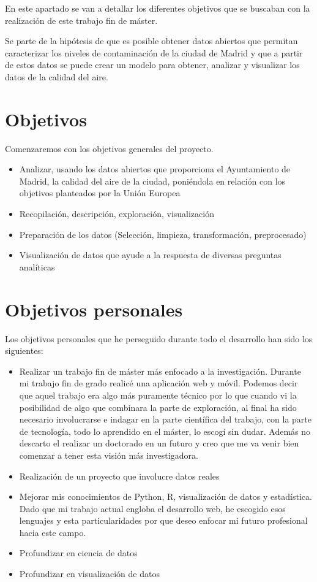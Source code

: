 
En este apartado se van a detallar los diferentes objetivos que se buscaban con la realización de este trabajo fin de máster.

Se parte de la hipótesis de que es posible obtener datos abiertos que permitan caracterizar  los niveles de contaminación de la ciudad de Madrid y que a partir de estos datos se puede crear un modelo para obtener, analizar y visualizar los datos 
de la calidad del aire.

\section{Objetivos}\label{objetivos-generales}
Comenzaremos con los objetivos generales del proyecto. 
\begin{itemize}
\tightlist
\item Analizar, usando los datos abiertos que proporciona el Ayuntamiento de Madrid, la calidad del aire de la ciudad, poniéndola en relación con los objetivos planteados por la Unión Europea
\item Recopilación, descripción, exploración, visualización
\item Preparación de los datos (Selección, limpieza, transformación, preprocesado)
\item Visualización de datos que ayude a la respuesta de diversas preguntas analíticas 
\end{itemize}

\section{Objetivos personales}\label{objetivos-personales}
Los objetivos personales que he perseguido durante todo el desarrollo han sido los siguientes:
\begin{itemize}
\tightlist
\item
 Realizar un trabajo fin de máster más enfocado a la investigación. Durante mi trabajo fin de grado realicé una aplicación web y móvil. Podemos decir que aquel trabajo era algo más puramente técnico por lo que cuando vi la posibilidad de algo que combinara la parte de exploración, al final ha sido necesario involucrarse e indagar en la parte científica del trabajo, con la parte de tecnología, todo lo aprendido en el máster, lo escogí sin dudar. Además no descarto el realizar un doctorado en un futuro y creo que me va venir bien comenzar a tener esta visión más investigadora.
 \item
 Realización de un proyecto que involucre datos reales
\item
  Mejorar mis conocimientos de Python, R, visualización de datos y estadística. Dado que mi trabajo actual engloba el desarrollo web, he escogido esos lenguajes y esta particularidades por que deseo enfocar mi futuro profesional hacia este campo.
   \item Profundizar en ciencia de datos
  \item Profundizar en visualización de datos
\end{itemize}
